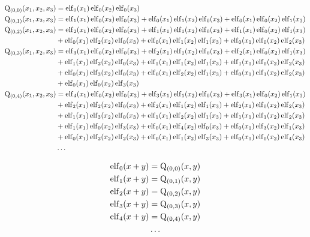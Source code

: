 \begin{equation*} \begin{aligned}
\mathrm{Q}_{(0,0)}(x_1, x_2, x_3) &=  
  \elf_0(x_1) \elf_0(x_2) \elf_0(x_3) \\
%
\mathrm{Q}_{(0,1)}(x_1, x_2, x_3) &=  
  \elf_1(x_1) \elf_0(x_2) \elf_0(x_3)
+ \elf_0(x_1) \elf_1(x_2) \elf_0(x_3)
+ \elf_0(x_1) \elf_0(x_2) \elf_1(x_3) \\
%
\mathrm{Q}_{(0,2)}(x_1, x_2, x_3) &=  
  \elf_2(x_1) \elf_0(x_2) \elf_0(x_3)
+ \elf_1(x_1) \elf_1(x_2) \elf_0(x_3)
+ \elf_1(x_1) \elf_0(x_2) \elf_1(x_3) \\ &
+ \elf_0(x_1) \elf_2(x_2) \elf_0(x_3)
+ \elf_0(x_1) \elf_1(x_2) \elf_1(x_3)
+ \elf_0(x_1) \elf_0(x_2) \elf_2(x_3) \\
%
\mathrm{Q}_{(0,3)}(x_1, x_2, x_3) &=  
  \elf_3(x_1) \elf_0(x_2) \elf_0(x_3)
+ \elf_2(x_1) \elf_1(x_2) \elf_0(x_3)
+ \elf_2(x_1) \elf_0(x_2) \elf_1(x_3) \\ &
+ \elf_1(x_1) \elf_2(x_2) \elf_0(x_3)
+ \elf_1(x_1) \elf_1(x_2) \elf_1(x_3)
+ \elf_1(x_1) \elf_0(x_2) \elf_2(x_3) \\ &
+ \elf_0(x_1) \elf_3(x_2) \elf_0(x_3)
+ \elf_0(x_1) \elf_2(x_2) \elf_1(x_3)
+ \elf_0(x_1) \elf_1(x_2) \elf_2(x_3) \\ &
+ \elf_0(x_1) \elf_0(x_2) \elf_3(x_3) \\
%
\mathrm{Q}_{(0,4)}(x_1, x_2, x_3) &=  
  \elf_4(x_1) \elf_0(x_2) \elf_0(x_3)
+ \elf_3(x_1) \elf_1(x_2) \elf_0(x_3)
+ \elf_3(x_1) \elf_0(x_2) \elf_1(x_3) \\ &
+ \elf_2(x_1) \elf_2(x_2) \elf_0(x_3)
+ \elf_2(x_1) \elf_1(x_2) \elf_1(x_3)
+ \elf_2(x_1) \elf_0(x_2) \elf_2(x_3) \\ &
+ \elf_1(x_1) \elf_3(x_2) \elf_0(x_3)
+ \elf_1(x_1) \elf_2(x_2) \elf_1(x_3)
+ \elf_1(x_1) \elf_1(x_2) \elf_2(x_3) \\ &
+ \elf_1(x_1) \elf_0(x_2) \elf_3(x_3)
+ \elf_0(x_1) \elf_4(x_2) \elf_0(x_3)
+ \elf_0(x_1) \elf_3(x_2) \elf_1(x_3) \\ &
+ \elf_0(x_1) \elf_2(x_2) \elf_2(x_3)
+ \elf_0(x_1) \elf_1(x_2) \elf_3(x_3)
+ \elf_0(x_1) \elf_0(x_2) \elf_4(x_3) \\
%
&\ldots \\
\end{aligned} \end{equation*}

\begin{equation*} \begin{aligned}
\operatorname{elf}_0(x + y) &= \mathrm{Q}_{(0,0)}(x, y) \\
\operatorname{elf}_1(x + y) &= \mathrm{Q}_{(0,1)}(x, y) \\
\operatorname{elf}_2(x + y) &= \mathrm{Q}_{(0,2)}(x, y) \\
\operatorname{elf}_3(x + y) &= \mathrm{Q}_{(0,3)}(x, y) \\
\operatorname{elf}_4(x + y) &= \mathrm{Q}_{(0,4)}(x, y) \\
&\ldots \\
\end{aligned} \end{equation*}
